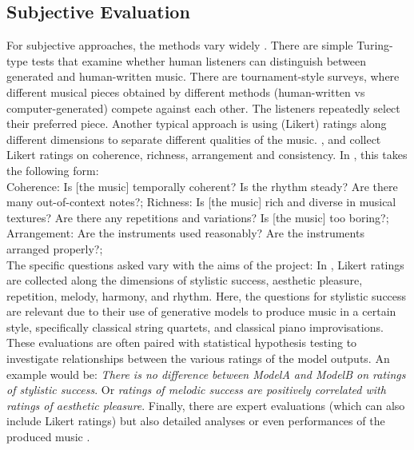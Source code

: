 \subsection{Subjective Evaluation}
For subjective approaches, the methods vary widely \cite{Xiong_Wang_ai_eval_methods_2023}. There are simple Turing-type tests that examine whether human listeners can distinguish between generated and human-written music. There are tournament-style surveys, where different musical pieces obtained by different methods (human-written vs computer-generated) compete against each other. The listeners repeatedly select their preferred piece.\cite{Huang_Vaswani_Uszkoreit_Shazeer_Simon_Hawthorne_Dai_Hoffman_Dinculescu_Eck_2018}\cite{Rütte_figaro_2023}
Another typical approach is using (Likert) ratings along different dimensions to separate different qualities of the music. \cite{Dong_Chen_MMT_Kirkpatrick_2023}, \cite{Yu_Lu_Wang_Hu_Tan_Ye_Zhang_museformer_2022} and \cite{Chen_Smith_Spijkervet_Wang_Zou_Li_Kong_Du_2024} collect Likert ratings on coherence, richness, arrangement and consistency. In \cite{Dong_Chen_MMT_Kirkpatrick_2023}, this takes the following form: \\
Coherence: Is [the music] temporally coherent? Is the rhythm steady? Are there many out-of-context notes?;
Richness: Is [the music] rich and diverse in musical textures? Are there any repetitions and variations? Is [the music] too boring?; 
Arrangement: Are the instruments used reasonably? Are the instruments arranged properly?; \\
The specific questions asked vary with the aims of the project: 
In \cite{Yin_Reuben_Stepney_Collins_2023}, Likert ratings are collected along the dimensions of stylistic success, aesthetic pleasure, repetition, melody, harmony, and rhythm. Here, the questions for stylistic success are relevant due to their use of generative models to produce music in a certain style, specifically classical string quartets, and classical piano improvisations. 
These evaluations are often paired with statistical hypothesis testing to investigate relationships between the various ratings of the model outputs. An example would be: \textit{There is no difference between ModelA and ModelB on ratings of stylistic success}. Or \textit{ratings of melodic success are positively correlated with ratings of aesthetic pleasure}.
Finally, there are expert evaluations (which can also include Likert ratings) but also detailed analyses or even performances of the produced music \cite{Sturm_Ben-Tal_2016} \cite{Yin_Reuben_Stepney_Collins_2023}. \\

